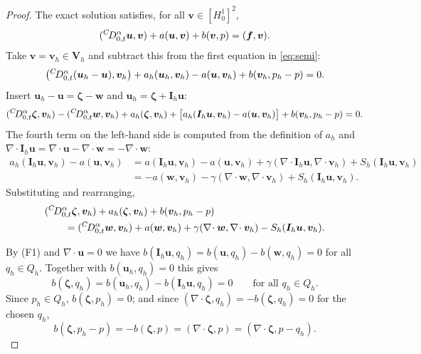 \begin{proof}
The exact solution satisfies, for all $\bm v\in[H^1_0]^2$,
\[
({}^{C}\!D_{0,t}^{\alpha}\bm u,\bm v)+a(\bm u,\bm v)+b(\bm v,p)=(\bm f,\bm v).
\]
Take $\bm v=\bm v_h\in\bm V_h$ and subtract this from the first equation in \eqref{eq:semi}:
\[
\bigl({}^{C}\!D_{0,t}^{\alpha}(\bm u_h-\bm u),\bm v_h\bigr)+a_h(\bm u_h,\bm v_h)-a(\bm u,\bm v_h)+b(\bm v_h,p_h-p)=0 .
\]
Insert $\bm u_h-\bm u=\bm\zeta-\bm w$ and $\bm u_h=\bm\zeta+\bm I_h\bm u$:
\[
({}^{C}\!D_{0,t}^{\alpha}\bm\zeta,\bm v_h)-({}^{C}\!D_{0,t}^{\alpha}\bm w,\bm v_h)+a_h(\bm\zeta,\bm v_h)+\bigl[a_h(\bm I_h\bm u,\bm v_h)-a(\bm u,\bm v_h)\bigr]+b(\bm v_h,p_h-p)=0 .
\]
The fourth term on the left-hand side is computed from the definition of $a_h$ and $\nabla\!\cdot\bm I_h\bm u=\nabla\!\cdot\bm u-\nabla\!\cdot\bm w=-\nabla\!\cdot\bm w$:
\[
\begin{aligned}
a_h(\bm I_h\bm u,\bm v_h)-a(\bm u,\bm v_h)&=a(\bm I_h\bm u,\bm v_h)-a(\bm u,\bm v_h)+\gamma(\nabla\!\cdot\bm I_h\bm u,\nabla\!\cdot\bm v_h)+S_h(\bm I_h\bm u,\bm v_h)\\
&=-a(\bm w,\bm v_h)-\gamma(\nabla\!\cdot\bm w,\nabla\!\cdot\bm v_h)+S_h(\bm I_h\bm u,\bm v_h).
\end{aligned}
\]
Substituting and rearranging,
\begin{equation}\label{eq:err}
\begin{aligned}
&({}^{C}\!D_{0,t}^{\alpha}\bm\zeta,\bm v_h)+a_h(\bm\zeta,\bm v_h)+b(\bm v_h,p_h-p)\\
&\qquad=({}^{C}\!D_{0,t}^{\alpha}\bm w,\bm v_h)+a(\bm w,\bm v_h)+\gamma(\nabla\!\cdot\bm w,\nabla\!\cdot\bm v_h)-S_h(\bm I_h\bm u,\bm v_h).
\end{aligned}
\end{equation}

By (F1) and $\nabla\!\cdot\bm u=0$ we have $b(\bm I_h\bm u,q_h)=b(\bm u,q_h)-b(\bm w,q_h)=0$ for all $q_h\in Q_h$. Together with $b(\bm u_h,q_h)=0$ this gives
\[
b(\bm\zeta,q_h)=b(\bm u_h,q_h)-b(\bm I_h\bm u,q_h)=0\qquad\text{for all }q_h\in Q_h .
\]
Since $p_h\in Q_h$, $b(\bm\zeta,p_h)=0$; and since $(\nabla\!\cdot\bm\zeta,q_h)=-b(\bm\zeta,q_h)=0$ for the chosen $q_h$,
\begin{equation}\label{eq:zeta-pressure}
b(\bm\zeta,p_h-p)=-b(\bm\zeta,p)=(\nabla\!\cdot\bm\zeta,p)=(\nabla\!\cdot\bm\zeta,p-q_h).
\end{equation}


\end{proof}
